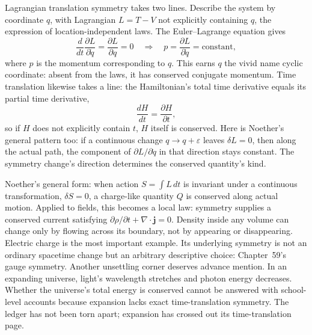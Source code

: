 \begin{mathbridge}
Lagrangian translation symmetry takes two lines. Describe the system by coordinate \(q\), with Lagrangian \(L=T-V\) not explicitly containing \(q\), the expression of location-independent laws. The Euler--Lagrange equation gives
\[
\frac{d}{dt}\frac{\partial L}{\partial \dot q}=\frac{\partial L}{\partial q}=0
\quad\Longrightarrow\quad
p=\frac{\partial L}{\partial \dot q}=\text{constant},
\]
where \(p\) is the momentum corresponding to \(q\). This earns \(q\) the vivid name cyclic coordinate: absent from the laws, it has conserved conjugate momentum. Time translation likewise takes a line: the Hamiltonian's total time derivative equals its partial time derivative,
\[
\frac{dH}{dt}=\frac{\partial H}{\partial t},
\]
so if \(H\) does not explicitly contain \(t\), \(H\) itself is conserved. Here is Noether's general pattern too: if a continuous change \(q\to q+\varepsilon\) leaves \(\delta L=0\), then along the actual path, the component of \(\partial L/\partial \dot q\) in that direction stays constant. The symmetry change's direction determines the conserved quantity's kind.
\end{mathbridge}

\begin{challenge}
Noether's general form: when action \(S=\int L\,dt\) is invariant under a continuous transformation, \(\delta S=0\), a charge-like quantity \(Q\) is conserved along actual motion. Applied to fields, this becomes a local law: symmetry supplies a conserved current satisfying \(\partial\rho/\partial t+\nabla\!\cdot\!\mathbf j=0\). Density inside any volume can change only by flowing across its boundary, not by appearing or disappearing. Electric charge is the most important example. Its underlying symmetry is not an ordinary spacetime change but an arbitrary descriptive choice: Chapter~59's gauge symmetry. Another unsettling corner deserves advance mention. In an expanding universe, light's wavelength stretches and photon energy decreases. Whether the universe's total energy is conserved cannot be answered with school-level accounts because expansion lacks exact time-translation symmetry. The ledger has not been torn apart; expansion has crossed out its time-translation page.
\end{challenge}

